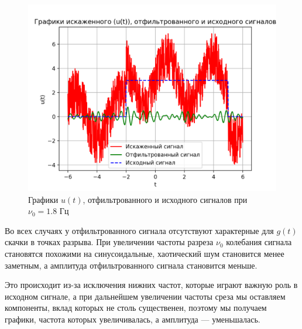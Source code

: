 \clearpage

\begin{figure}[ht!]
    \centering
    \includegraphics[scale=0.75]{media/1 task/low_freq/Cleaned_4_2_2_-1,7987987987987988.png}
    \caption{Графики  $u(t)$, отфильтрованного и исходного сигналов при $\nu_0=1.8$ Гц}
    \label{fig:cleaned_4_2_2_1.8}
\end{figure}

Во всех случаях у отфильтрованного сигнала отсутствуют характерные для $g(t)$ скачки в точках разрыва. При увеличении частоты разреза $\nu_0$ колебания сигнала становятся похожими на синусоидальные, хаотический шум становится менее заметным, а амплитуда отфильтрованного сигнала становится меньше. 

Это происходит из-за исключения нижних частот, которые играют важную роль в исходном сигнале, а при дальнейшем увеличении частоты среза мы оставляем компоненты, вклад которых не столь существенен, поэтому мы получаем графики, частота которых увеличивалась, а амплитуда --- уменьшалась. 